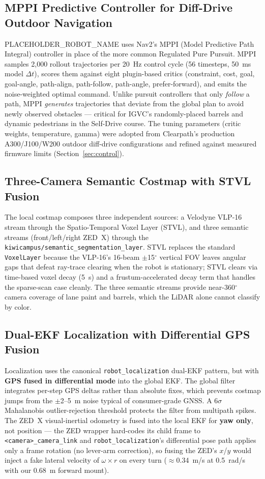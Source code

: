 \documentclass[11pt, letterpaper]{article}
\newcommand{\robotname}{PLACEHOLDER\_ROBOT\_NAME}
\begin{document}
\subsection{MPPI Predictive Controller for Diff-Drive Outdoor Navigation}

\robotname{} uses Nav2's MPPI (Model Predictive Path Integral) controller in place of the
more common Regulated Pure Pursuit. MPPI samples 2{,}000 rollout trajectories per
20~Hz control cycle (56 timesteps, 50~ms model $\Delta t$), scores them against eight
plugin-based critics (constraint, cost, goal, goal-angle, path-align, path-follow,
path-angle, prefer-forward), and emits the noise-weighted optimal command. Unlike pursuit
controllers that only \textit{follow} a path, MPPI \textit{generates} trajectories that
deviate from the global plan to avoid newly observed obstacles --- critical for IGVC's
randomly-placed barrels and dynamic pedestrians in the Self-Drive course. The tuning
parameters (critic weights, temperature, gamma) were adopted from Clearpath's
production A300/J100/W200 outdoor diff-drive configurations and refined against measured
firmware limits (Section~\ref{sec:control}).

\subsection{Three-Camera Semantic Costmap with STVL Fusion}

The local costmap composes three independent sources: a Velodyne VLP-16 stream through the
Spatio-Temporal Voxel Layer (STVL), and three semantic streams (front/left/right ZED~X)
through the \texttt{kiwicampus/semantic\_segmentation\_layer}. STVL replaces the standard
\texttt{VoxelLayer} because the VLP-16's 16-beam $\pm$15$^\circ$ vertical FOV leaves angular
gaps that defeat ray-trace clearing when the robot is stationary; STVL clears via time-based
voxel decay (5~s) and a frustum-accelerated decay term that handles the sparse-scan case
cleanly. The three semantic streams provide near-360$^\circ$ camera coverage of lane paint
and barrels, which the LiDAR alone cannot classify by color.

\subsection{Dual-EKF Localization with Differential GPS Fusion}

Localization uses the canonical \texttt{robot\_localization} dual-EKF pattern, but with
\textbf{GPS fused in differential mode} into the global EKF. The global filter integrates
per-step GPS deltas rather than absolute fixes, which prevents costmap jumps from the
$\pm$2--5~m noise typical of consumer-grade GNSS. A 6$\sigma$
Mahalanobis outlier-rejection threshold protects the filter from multipath spikes. The
ZED~X visual-inertial odometry is fused into the local EKF for \textbf{yaw only}, not
position --- the ZED wrapper hard-codes its child frame to \texttt{<camera>\_camera\_link}
and \texttt{robot\_localization}'s differential pose path applies only a frame rotation
(no lever-arm correction), so fusing the ZED's $x$/$y$ would inject a fake lateral velocity
of $\omega \times r$ on every turn ($\approx$0.34~m/s at 0.5~rad/s with our 0.68~m forward
mount).
\end{document}
